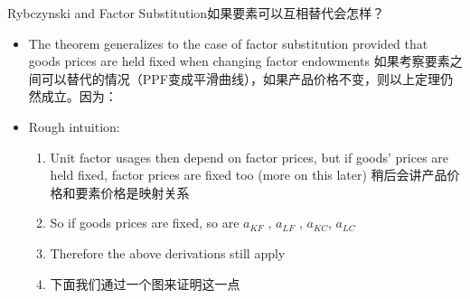 \documentclass[10pt,hyperref={CJKbookmarks=true},xcolor=dvipsnames,aspectratio=169]{beamer}
\begin{document}
\begin{frame}{Rybczynski and Factor Substitution如果要素可以互相替代会怎样？}

\begin{itemize}
\item The theorem generalizes to the case of factor substitution provided
that goods prices are held fixed when changing factor endowments 如果考察要素之间可以替代的情况（PPF变成平滑曲线），如果产品价格不变，则以上定理仍然成立。因为：
\item Rough intuition: 

\begin{enumerate}
\item Unit factor usages then depend on factor prices, but if goods’ prices
are held fixed, factor prices are fixed too (more on this later) 稍后会讲产品价格和要素价格是映射关系
\item So if goods prices are fixed, so are $a_{KF}$ , $a_{LF}$ , $a_{KC}$,
$a_{LC}$ 
\item Therefore the above derivations still apply
\item 下面我们通过一个图来证明这一点
\end{enumerate}
\end{itemize}
\end{frame}
\end{document}
